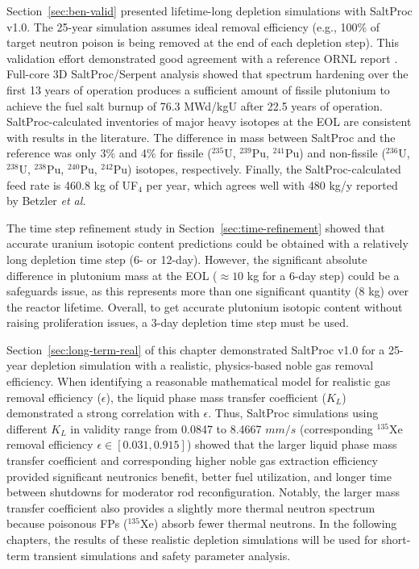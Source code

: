 Section~\ref{sec:ben-valid} presented lifetime-long depletion simulations with 
SaltProc v1.0. The 25-year simulation assumes ideal removal efficiency 
(e.g., 100\% of target neutron poison is being removed at the end of each 
depletion 
step). This validation effort demonstrated good agreement with a reference 
ORNL report \cite{betzler_assessment_2017-1}. Full-core 3D SaltProc/Serpent 
analysis showed that spectrum 
hardening over the first 13 years of operation 
produces a sufficient amount of fissile plutonium to achieve the fuel salt 
burnup of 76.3 MWd/kgU after 22.5 years of operation. SaltProc-calculated 
inventories of major heavy isotopes at the \gls{EOL} are consistent with 
results in the literature. The difference in mass between SaltProc and the 
reference was only 3\% and 4\% for fissile ($^{235}$U, $^{239}$Pu, $^{241}$Pu) 
and non-fissile ($^{236}$U, $^{238}$U, $^{238}$Pu, $^{240}$Pu, $^{242}$Pu) 
isotopes, respectively. Finally, the SaltProc-calculated feed rate is 460.8 kg 
of UF$_4$ per year, which agrees well with 480 kg/y reported by Betzler 
\emph{et al.} \cite{betzler_assessment_2017-1}

The time step refinement study in Section~\ref{sec:time-refinement} showed 
that accurate uranium isotopic content predictions could be obtained with a 
relatively long depletion time step (6- or 12-day). However, the significant 
absolute difference in plutonium mass at the \gls{EOL} ($\approx10$ kg for a 
6-day step) could be a safeguards issue, as this represents more than one 
significant quantity (8 kg) over the reactor lifetime. Overall, to get 
accurate plutonium isotopic content without raising proliferation issues, a 
3-day depletion time step must be used.

Section~\ref{sec:long-term-real} of this chapter demonstrated SaltProc v1.0 
for a 25-year depletion simulation with a realistic, physics-based noble gas 
removal efficiency. When identifying a reasonable mathematical model 
for realistic gas removal efficiency ($\epsilon$), the liquid phase mass 
transfer coefficient ($K_L$) demonstrated a strong correlation with 
$\epsilon$. Thus, SaltProc simulations using different $K_L$ in validity range 
from 0.0847 to 8.4667 $mm/s$ (corresponding $^{135}$Xe removal efficiency 
$\epsilon\in [0.031,0.915]$) showed that the larger liquid phase mass transfer 
coefficient and corresponding higher noble gas extraction efficiency provided 
significant neutronics benefit, better fuel utilization, and longer time 
between shutdowns for moderator rod reconfiguration. Notably, the larger mass 
transfer coefficient also provides a slightly more thermal neutron spectrum 
because poisonous \glspl{FP} ($^{135}$Xe) absorb fewer thermal neutrons. In 
the following chapters, the results of these realistic depletion simulations 
will be used for short-term transient simulations and safety parameter 
analysis. 

